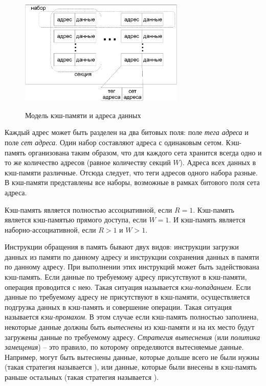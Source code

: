 \begin{figure}[h] \center
  \includegraphics[width=0.7\textwidth]{1.review/cache}\\
  \caption{Модель кэш-памяти и адреса данных}\label{cache_model}
\end{figure}

Каждый адрес может быть разделен на два битовых поля: поле
\emph{тега адреса} и поле \emph{сет адреса}. Один набор составляют
адреса с одинаковым сетом. Кэш-память организована таким образом,
что для каждого сета хранится всегда одно и то же количество адресов
(равное количеству секций $W$). Адреса всех данных в кэш-памяти
различные. Отсюда следует, что теги адресов одного набора разные. В
кэш-памяти представлены все наборы, возможные в рамках битового поля
сета адреса.

Кэш-память является полностью ассоциативной, если $R = 1$.
Кэш-память является кэш-памятью прямого доступа, если $W = 1$. И
кэш-память является наборно-ассоциативной, если $R > 1$ и $W > 1$.

Инструкции обращения в память бывают двух видов: инструкции загрузки
данных из памяти по данному адресу и инструкции сохранения данных в
памяти по данному адресу. При выполнении этих инструкций может быть
задействована кэш-память. Если данные по требуемому адресу
присутствуют в кэш-памяти, операция проводится с нею. Такая ситуация
называется \emph{кэш-попаданием}. Если данные по требуемому адресу
не присутствуют в кэш-памяти, осуществляется подгрузка данных в
кэш-память и совершение операции. Такая ситуация называется
\emph{кэш-промахом}. В этом случае если кэш-память полностью
заполнена, некоторые данные должны быть \emph{вытеснены} из
кэш-памяти и на их место будут загружены данные по требуемому
адресу. \emph{Стратегия вытеснения} (или \emph{политика замещения})
-- это правило, по которому определяются вытесняемые данные.
Например, могут быть вытеснены данные, которые дольше всего не были
нужны (такая стратегия называется \LRU), или данные, которые были
внесены в кэш-память раньше остальных (такая стратегия называется
\FIFO).

